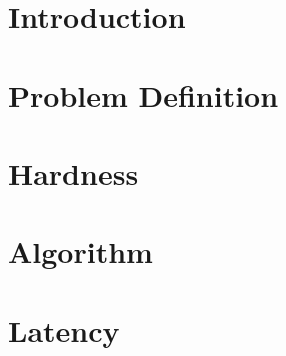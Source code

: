\begin{abstract}

\end{abstract}

\section{Introduction}


\section{Problem Definition}


\section{Hardness}


\section{Algorithm}


\section{Latency}

